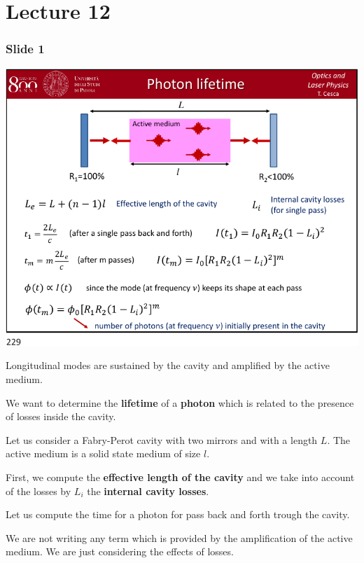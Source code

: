 \documentclass[../main/main.tex]{subfiles}
\begin{document}
\pagestyle{plain}

\section{Lecture 12}


\subsubsection*{Slide 1}

\begin{minipage}[]{0.5\linewidth}
\centering
\includegraphics[page=1,width=1\textwidth]{../lessons/pdf_file/12_lecture.pdf}
\end{minipage}
\hspace{0.3cm}\vspace{0.3cm}
\begin{minipage}[c]{0.47\linewidth}

Longitudinal modes are sustained by the cavity and amplified by the active medium.

We want to determine the \textbf{lifetime} of a  \textbf{photon} which is related to the presence of losses inside the cavity.

Let us consider a Fabry-Perot cavity with two mirrors and with a length \( L \). The active medium is a solid state medium of size \( l \).

First, we compute the \textbf{effective length of the cavity} and we take into account of the losses by \( L_i \) the \textbf{internal cavity losses}.

Let us compute the time for a photon for pass back and forth trough the cavity.

We are not writing any term which is provided by the amplification of the active medium. We are just considering the effects of losses.

\end{minipage}
\end{document}
